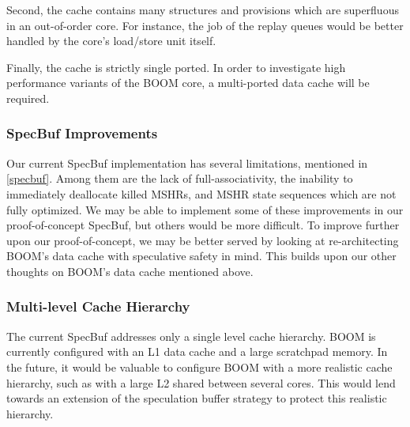Second, the cache contains many structures and provisions which are superfluous in an out-of-order core.
For instance, the job of the replay queues would be better handled by the core's load/store unit itself.

Finally, the cache is strictly single ported. In order to investigate high performance variants of the BOOM core,
a multi-ported data cache will be required.

\subsubsection{SpecBuf Improvements}
Our current SpecBuf implementation has several limitations, mentioned in \ref{specbuf}.
Among them are the lack of full-associativity, the inability to immediately deallocate killed MSHRs, and MSHR state sequences which are not fully optimized.
We may be able to implement some of these improvements in our proof-of-concept SpecBuf, but others would be more difficult. To improve further upon
our proof-of-concept, we may be better served by looking at re-architecting BOOM's data cache with speculative safety in mind. This builds upon our other thoughts
on BOOM's data cache mentioned above.

\subsubsection{Multi-level Cache Hierarchy}
The current SpecBuf addresses only a single level cache hierarchy.
BOOM is currently configured with an L1 data cache and a large scratchpad memory.
In the future, it would be valuable to configure BOOM with a more realistic cache hierarchy,
such as with a large L2 shared between several cores. This would lend towards an extension of the speculation
buffer strategy to protect this realistic hierarchy.
